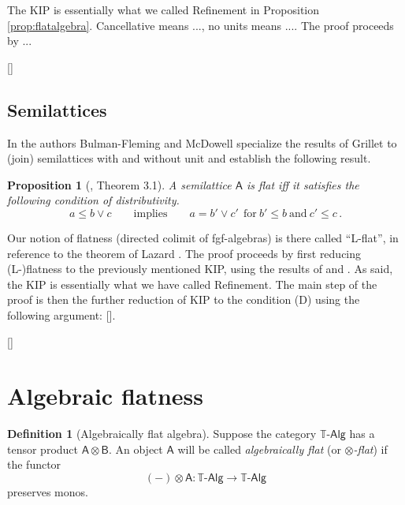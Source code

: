 \documentclass[12pt]{article}
\newcommand{\ednote}[1]{[\textit{\color{red}{#1}}]} %
\newcommand{\C}{\ensuremath{\mathbb{C}}}
\newcommand{\T}{\ensuremath{\mathbb{T}}}
\newcommand{\pshat}[1]{\ensuremath{\widehat{#1}}}
\newcommand{\Set}{\ensuremath{\mathsf{Set}}}
\newcommand{\y}{\ensuremath{\mathsf{y}}} %
\newcommand{\TAlg}{\ensuremath{\T\text{-}\mathsf{Alg}}}
\newcommand{\alg}[1]{\ensuremath{\mathsf{#1}}}
\newcommand{\algA}{\ensuremath{\mathsf{A}}}
\newcommand{\too}{\ensuremath{\longrightarrow}}
\newtheorem{proposition}[theorem]{Proposition}
\theoremstyle{remark}
\theoremstyle{definition}
\newtheorem{definition}[theorem]{Definition}
\begin{document}
{ The KIP is essentially what we called Refinement in Proposition \ref{prop:flatalgebra}.   Cancellative means ..., no units means ....
 The proof proceeds by ...
 
 \ednote{add a brief summary} 
 
\subsection{Semilattices}

In \cite{BF-MD:78} the authors Bulman-Fleming and McDowell specialize the results of Grillet to (join) semilattices with and without unit and establish the following result.

\begin{proposition}[\cite{BF-MD:78}, Theorem 3.1]
A semilattice $\algA$ is flat iff it satisfies the following condition of \emph{distributivity}.
\begin{equation}\label{prop:flatequalsdist}\tag{D}
a \leq b\vee c\qquad\text{implies}\qquad a = b' \vee c'\ \ \text{for}\  b'\leq b\ \text{and}\ c'\leq c\,.
\end{equation}
\end{proposition} 

Our notion of flatness (directed colimit of fgf-algebras) is there called ``L-flat'', in reference to the theorem of Lazard \cite{L:1969}.  The proof proceeds by first reducing (L-)flatness to the previously mentioned  KIP, using the results of \cite{Grillet} and \cite{Shannon}.  As said, the KIP is essentially what we have called Refinement.  The main step of the proof is then the further reduction of KIP to the condition (D) using the following argument:
\ednote{summarize the proof of 2.7}. 

\bigskip

\ednote{Other theories to consider: (not nec.\ commutative) monoids, distributive lattices with and w/o $0,1$, abelian groups, commutative rings, frames, boolean algebras.}

\section{Algebraic flatness}\label{section:algebraic_flat}

\begin{definition}[Algebraically flat algebra]  Suppose the category $\TAlg$ has a tensor product $\alg{A} \otimes \alg{B}$. An object $\alg{A}$ will be called \emph{algebraically flat} (or \emph{$\otimes$-flat}) if the functor $$(-)\otimes \alg{A} : \TAlg \too \TAlg$$ preserves monos. 
\end{definition}

}
\end{document}
